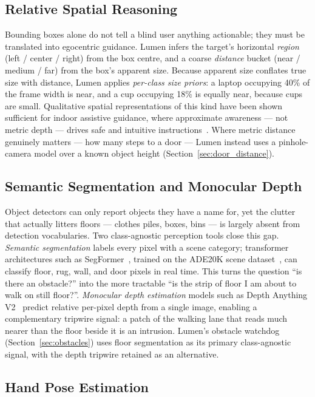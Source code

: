 \subsection{Relative Spatial Reasoning}

Bounding boxes alone do not tell a blind user anything actionable; they must be
translated into egocentric guidance. Lumen infers the target's horizontal
\emph{region} (left / center / right) from the box centre, and a coarse
\emph{distance} bucket (near / medium / far) from the box's apparent size. Because
apparent size conflates true size with distance, Lumen applies \emph{per-class size
priors}: a laptop occupying 40\% of the frame width is near, and a cup occupying 18\%
is equally near, because cups are small. Qualitative spatial representations of this
kind have been shown sufficient for indoor assistive guidance, where approximate
awareness --- not metric depth --- drives safe and intuitive
instructions~\cite{liu2019spatial}. Where metric distance genuinely matters --- how
many steps to a door --- Lumen instead uses a pinhole-camera model over a known
object height (Section~\ref{sec:door_distance}).

\subsection{Semantic Segmentation and Monocular Depth}

Object detectors can only report objects they have a name for, yet the clutter that
actually litters floors --- clothes piles, boxes, bins --- is largely absent from
detection vocabularies. Two class-agnostic perception tools close this gap.
\emph{Semantic segmentation} labels every pixel with a scene category; transformer
architectures such as SegFormer~\cite{xie2021segformer}, trained on the ADE20K scene
dataset~\cite{zhou2017ade20k}, can classify floor, rug, wall, and door pixels in real
time. This turns the question ``is there an obstacle?'' into the more tractable ``is
the strip of floor I am about to walk on still floor?''. \emph{Monocular depth
estimation} models such as Depth Anything V2~\cite{yang2024depthanything} predict
relative per-pixel depth from a single image, enabling a complementary tripwire
signal: a patch of the walking lane that reads much nearer than the floor beside it
is an intrusion. Lumen's obstacle watchdog (Section~\ref{sec:obstacles}) uses floor
segmentation as its primary class-agnostic signal, with the depth tripwire retained
as an alternative.

\subsection{Hand Pose Estimation}


